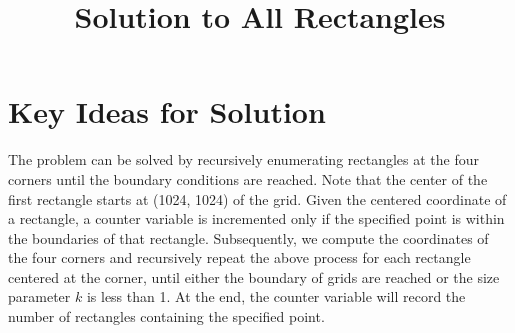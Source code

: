 \documentclass[12pt]{article}
\begin{document}
\title{Solution to All Rectangles}
\author{}
\date{}
\maketitle

\section{Key Ideas for Solution}

The problem can be solved by recursively enumerating rectangles at the four corners until the boundary conditions are reached. 
Note that the center of the first rectangle starts at (1024, 1024) of the grid. Given the centered coordinate of a rectangle, a counter variable is incremented only if the specified point is within the boundaries of that rectangle. Subsequently, we compute the coordinates of the four corners and recursively repeat the above process for each rectangle centered at the corner, until either the boundary of grids are reached or the size parameter $k$ is less than 1. At the end, the counter variable will record the number of rectangles containing the specified point.
\end{document}
